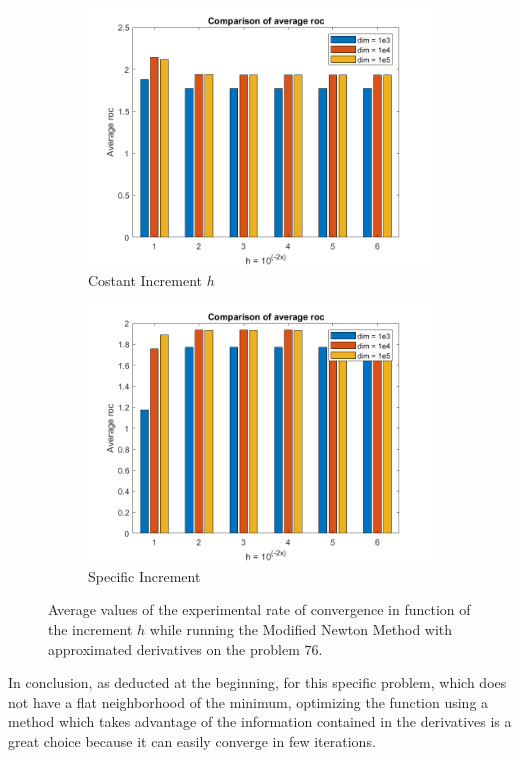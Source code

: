 \begin{figure}[htbp]
    \centering
    \begin{subfigure}[t]{0.45\textwidth}  %
        \centering
        \includegraphics[width=\textwidth]{img/pb76_MN_difffinite_COST_rateofconv.png}
        \caption{Costant Increment $h$}
    \end{subfigure}
    \hspace{1cm} %
    \begin{subfigure}[t]{0.45\textwidth}
        \centering
        \includegraphics[width=\textwidth]{img/pb76_MN_difffinite_REL_rateofconv.png}
        \caption{Specific Increment }
    \end{subfigure}
    \caption{ \small Average values of the experimental rate of convergence in function of the increment $h$  while running the Modified Newton Method with approximated derivatives on the problem $76$.}
    \label{76rocmn}
\end{figure}

In conclusion, as deducted at the beginning, for this specific problem, which does not have a flat neighborhood of the minimum, optimizing the function using a method which takes advantage of the information contained in the derivatives is a great choice because it can easily converge in few iterations.